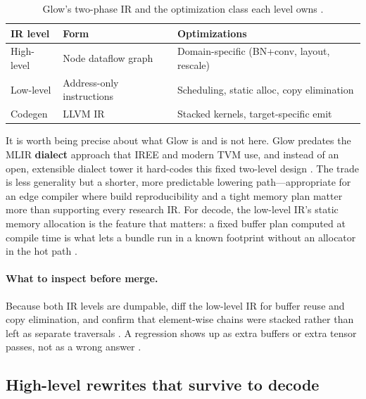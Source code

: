 \begin{table}[t]
\centering
\caption{Glow's two-phase IR and the optimization class each level owns \citep{rotem2018glow}.}
\label{tab:ch19_glow_ir}
\begin{tabular}{lll}
\toprule
IR level & Form & Optimizations \\
\midrule
High-level & Node dataflow graph & Domain-specific (BN+conv, layout, rescale) \\
Low-level & Address-only instructions & Scheduling, static alloc, copy elimination \\
Codegen & LLVM IR & Stacked kernels, target-specific emit \\
\bottomrule
\end{tabular}
\end{table}

It is worth being precise about what Glow is and is not here. Glow predates the MLIR \textbf{dialect} approach that IREE and modern TVM use, and instead of an open, extensible dialect tower it hard-codes this fixed two-level design \citep{rotem2018glow}. The trade is less generality but a shorter, more predictable lowering path---appropriate for an edge compiler where build reproducibility and a tight memory plan matter more than supporting every research IR. For decode, the low-level IR's static memory allocation is the feature that matters: a fixed buffer plan computed at compile time is what lets a bundle run in a known footprint without an allocator in the hot path \citep{taxbreak2026,patel2025llminference}.

\paragraph{What to inspect before merge.} Because both IR levels are dumpable, diff the low-level IR for buffer reuse and copy elimination, and confirm that element-wise chains were stacked rather than left as separate traversals \citep{rotem2018glow,memoryfloor2026}. A regression shows up as extra buffers or extra tensor passes, not as a wrong answer \citep{dlbook}.

\subsection{High-level rewrites that survive to decode}

